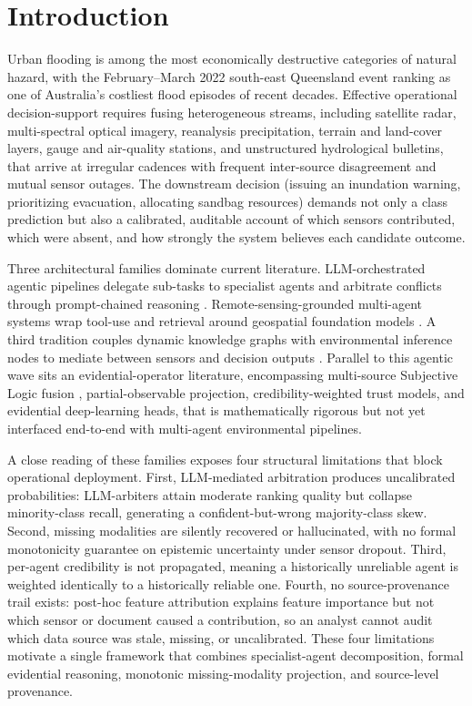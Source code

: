 \section{Introduction}\label{sec:introduction}

Urban flooding is among the most economically destructive categories of natural hazard, with the February--March 2022 south-east Queensland event ranking as one of Australia's costliest flood episodes of recent decades. Effective operational decision-support requires fusing heterogeneous streams, including satellite radar, multi-spectral optical imagery, reanalysis precipitation, terrain and land-cover layers, gauge and air-quality stations, and unstructured hydrological bulletins, that arrive at irregular cadences with frequent inter-source disagreement and mutual sensor outages. The downstream decision (issuing an inundation warning, prioritizing evacuation, allocating sandbag resources) demands not only a class prediction but also a calibrated, auditable account of which sensors contributed, which were absent, and how strongly the system believes each candidate outcome.

Three architectural families dominate current literature. LLM-orchestrated agentic pipelines delegate sub-tasks to specialist agents and arbitrate conflicts through prompt-chained reasoning \citep{jiang2026floodllm}. Remote-sensing-grounded multi-agent systems wrap tool-use and retrieval around geospatial foundation models \citep{talemi2026agentic, redaelli2026saferplaces}. A third tradition couples dynamic knowledge graphs with environmental inference nodes to mediate between sensors and decision outputs \citep{hofmeister2024semantic}. Parallel to this agentic wave sits an evidential-operator literature, encompassing multi-source Subjective Logic fusion \citep{vanderheijden2018multisource}, partial-observable projection, credibility-weighted trust models, and evidential deep-learning heads, that is mathematically rigorous but not yet interfaced end-to-end with multi-agent environmental pipelines.

A close reading of these families exposes four structural limitations that block operational deployment. First, LLM-mediated arbitration produces uncalibrated probabilities: LLM-arbiters attain moderate ranking quality but collapse minority-class recall, generating a confident-but-wrong majority-class skew. Second, missing modalities are silently recovered or hallucinated, with no formal monotonicity guarantee on epistemic uncertainty under sensor dropout. Third, per-agent credibility is not propagated, meaning a historically unreliable agent is weighted identically to a historically reliable one. Fourth, no source-provenance trail exists: post-hoc feature attribution explains feature importance but not which sensor or document caused a contribution, so an analyst cannot audit which data source was stale, missing, or uncalibrated. These four limitations motivate a single framework that combines specialist-agent decomposition, formal evidential reasoning, monotonic missing-modality projection, and source-level provenance.

